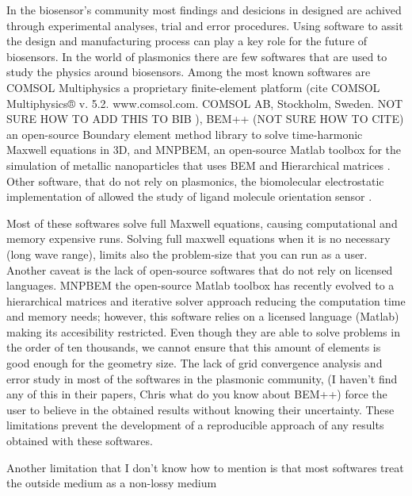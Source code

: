 
In the biosensor's community most findings and desicions in designed are achived 
through experimental analyses, trial and error procedures. Using
software to assit the design and manufacturing process can play a key role for 
the future of biosensors. In the world of plasmonics there are few softwares that are used 
to study the physics around biosensors.  Among the most known softwares are COMSOL Multiphysics
a proprietary finite-element platform ({\color{red}cite COMSOL Multiphysics® v. 5.2. 
www.comsol.com. COMSOL AB, Stockholm, Sweden. NOT SURE HOW TO ADD THIS TO BIB} ), 
BEM++ ({\color{red}NOT SURE HOW TO CITE}) an open-source Boundary element method
library to solve time-harmonic Maxwell equations in 3D, and 
MNPBEM, an open-source Matlab toolbox for the simulation of metallic nanoparticles that
uses BEM and Hierarchical matrices \cite{Hohenester2018}. Other software, that do
not rely on plasmonics, the biomolecular electrostatic implementation of 
\pygbe \cite{CooperETal2016} allowed the study of ligand molecule orientation 
sensor \cite{CooperClementiBarba2015}.



Most of these softwares solve full Maxwell equations, causing computational and 
memory expensive runs. Solving full maxwell equations when it is no necessary (long wave range), 
limits also the problem-size that you can run as a user. Another caveat is the
lack of open-source softwares that do not rely on licensed languages. MNPBEM the
open-source Matlab toolbox has recently evolved to a hierarchical
matrices and iterative solver approach reducing the computation time and memory
needs; however, this software relies on a licensed language (Matlab) making its
accesibility restricted. Even though they are able to solve problems in the order
of ten thousands, we cannot ensure that this amount of elements is good enough for 
the geometry size. The lack of grid convergence analysis and error study in most of the 
softwares in the plasmonic community,
{\color{red}(I haven't find any of this in their papers, Chris what do you know about BEM++)}
force the user to believe in the obtained results without knowing their uncertainty. These
limitations prevent the development of a reproducible approach of any results obtained
with these softwares. 

{\color{red} Another limitation that I don't know how to mention is that most softwares
treat the outside medium as a non-lossy medium}

